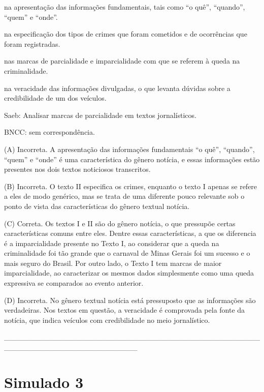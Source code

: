 \begin{escolha}
\item na apresentação das informações fundamentais, tais como ``o quê'',
``quando'', ``quem'' e ``onde''.

\item na especificação dos tipos de crimes que foram cometidos e de
ocorrências que foram registradas.

\item nas marcas de parcialidade e imparcialidade com que se referem à
queda na criminalidade.

\item na veracidade das informações divulgadas, o que levanta dúvidas sobre
a credibilidade de um dos veículos.
\end{escolha}

Saeb: Analisar marcas de parcialidade em textos jornalísticos.

BNCC: sem correspondência.

(A) Incorreta. A apresentação das informações fundamentais ``o quê'',
``quando'', ``quem'' e ``onde'' é uma característica do gênero notícia,
e essas informações estão presentes nos dois textos noticiosos
transcritos.

(B) Incorreta. O texto II especifica os crimes, enquanto o texto I
apenas se refere a eles de modo genérico, mas se trata de uma diferente
pouco relevante sob o ponto de vista das características do gênero
textual notícia.

(C) Correta. Os textos I e II são do gênero notícia, o que pressupõe
certas características comuns entre eles. Dentre essas características,
a que os diferencia é a imparcialidade presente no Texto I, ao
considerar que a queda na criminalidade foi tão grande que o carnaval de
Minas Gerais foi um sucesso e o mais seguro do Brasil. Por outro lado, o
Texto I tem marcas de maior imparcialidade, ao caracterizar os mesmos
dados simplesmente como uma queda expressiva se comparados ao evento
anterior.

(D) Incorreta. No gênero textual notícia está pressuposto que as
informações são verdadeiras. Nos textos em questão, a veracidade é
comprovada pela fonte da notícia, que indica veículos com credibilidade
no meio jornalístico.

\_\_\_\_\_\_\_\_\_\_\_\_\_\_\_\_\_\_\_\_\_\_\_\_\_\_\_\_\_\_\_\_\_\_\_\_\_\_\_\_\_\_\_\_\_\_\_\_\_\_\_\_\_\_\_\_\_\_\_\_\_\_\_\_\_\_\_\_\_\_\_\_\_

\section{Simulado 3}

